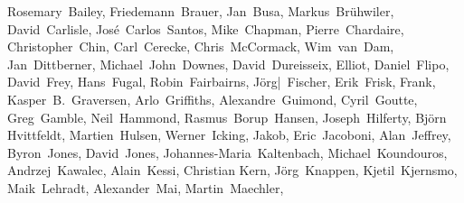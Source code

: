 { \flushleft\small
Rosemary~Bailey,        %
Friedemann~Brauer,      %
Jan~Busa,               %
Markus~Br\"uhwiler,     %
David~Carlisle,         %
Jos\'e~Carlos~Santos,   %
Mike~Chapman,           %
Pierre~Chardaire,       %
Christopher~Chin,       %
Carl~Cerecke,           %
Chris~McCormack,        %
Wim~van~Dam,            %
Jan~Dittberner,         %
Michael~John~Downes,    %
David~Dureisseix,       %
Elliot,                 %
Daniel~Flipo,           %
David~Frey,             %
Hans~Fugal,             %
Robin~Fairbairns,       %
J\"org|~Fischer,        %
Erik~Frisk,             %
Frank,                  %
Kasper~B.~Graversen,    %
Arlo~Griffiths,         %
Alexandre~Guimond,      %
Cyril~Goutte,           %
Greg~Gamble,            %
Neil~Hammond,           %
Rasmus~Borup~Hansen,    %
Joseph~Hilferty,        %
Bj\"orn Hvittfeldt,     %
Martien~Hulsen,         %
Werner~Icking,          %
Jakob,                  %
Eric~Jacoboni,          %
Alan~Jeffrey,           %
Byron~Jones,            %
David~Jones,            %
Johannes-Maria~Kaltenbach, %
Michael~Koundouros,     %
Andrzej~Kawalec,        %
Alain~Kessi,            %
Christian Kern,         %
J\"org~Knappen,         %
Kjetil~Kjernsmo,        %
Maik~Lehradt,           %
Alexander~Mai,          %
Martin~Maechler,        %
}
